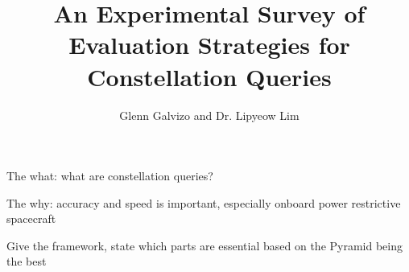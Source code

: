 \documentclass[11pt]{beamer}
\author{Glenn Galvizo and Dr. Lipyeow Lim}
\title{An Experimental Survey of Evaluation Strategies for Constellation Queries}
\institute{University of Hawaii at Manoa}
\begin{document}
    \begin{frame}
        \titlepage
    \end{frame}


	\begin{frame}
		The what: what are constellation queries?
	\end{frame}
	
	\begin{frame}
		The why: accuracy and speed is important, especially onboard power restrictive spacecraft

	\end{frame}
	
	\begin{frame}
		Give the framework, state which parts are essential based on the Pyramid being the best
	\end{frame}
	
    \begin{frame}
    \end{frame}
\end{document}

